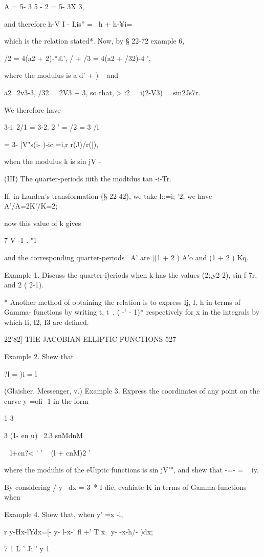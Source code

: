 A = 5- 3 5 - 2 = 5- 3X 3,

and therefore h-V I - Lis'' = \ h + h-¥i=

which is the relation stated*. Now, by § 22-72 example 6,

/2 = 4(a2 + 2)-*£', / + /3 = 4(a2 + /32)-4 ',

where the modulus is a d' + ) ~ and

a2=2v3-3, /32 = 2V3 + 3, so that, > :2 = i(2-V3) = sin2Js7r.

We therefore have

3-i. 2/1 = 3-2. 2 ' = /2 = 3 /i

= 3- |V"s(i- )-ic =i,r r(J)/r(|),

when the modulus k is sin jV -

(III) The quarter-periods iiith the modtdus tan -i-Tr.

If, in Landen's transformation (§ 22-42), we take l::=i; '2, we have
A'/A=2K'/K=2;

now this value of k gives

7 V -1 . "1

and the corresponding quarter-periods \, A' are |(1 + 2 ) A'o and (1 +
2 ) Kq.

Example 1. Discuss the quarter-i)eriods when k has the values
(2;,y2-2), sin f 7r, and 2 ( 2-1).

* Another method of obtaining the relation is to express Ij, I, h in
terms of Gamma- functions by writing t, t~, ( -' - 1)* respectively
for x in the integrals by which Ii, I2, I3 are defined.

22'82] THE JACOBIAN ELLIPTIC FUNCTIONS 527

Example 2. Shew that

?l = )i = l

(Glaisher, Messenger, v.) Example 3. Express the coordinates of any
point on the curve y =ofi- 1 in the form

1 3

3 (1- en u) \ 2.3 snMdnM

 ~ l+cn?< ' ' ~ (l + cnM)2 '

where the moduhis of the eUiptic functions is sin jV"", and shew that
-=- = ~ iy.

By considering / y~ dx = 3~* I die, evahiate K in terms of
Gamma-functions when

Example 4. Shew that, when y' =x -l,

r y-Hx-lYdx=[- y- l-x-' fl +' T x~ y- -x-h/- )dx;

7 1 L ' Ji ' y 1


